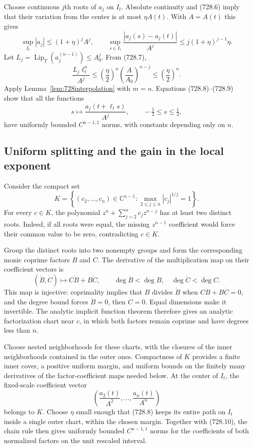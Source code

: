 \documentclass[11pt,a4paper]{article}
\theoremstyle{remark}
\begin{document}
Choose continuous $j$th roots of $a_j$ on $I_t$.  Absolute continuity and
(728.6) imply that their variation from the center is at most $\eta A(t)$.
With $A=A(t)$ this gives
\[
 \sup_{I_t}|a_j|\le(1+\eta)^jA^j,
 \qquad
 \sup_{s\in I_t}\frac{|a_j(s)-a_j(t)|}{A^j}
       \le j(1+\eta)^{j-1}\eta.
 \tag{728.8}
\]
Let $L_j=\operatorname{Lip}_T(a_j^{(n-1)})\le A_0^j$.  From (728.7),
\[
 \frac{L_j\ell_t^n}{A^j}
 \le \left(\frac\eta2\right)^n
           \left(\frac{A}{A_0}\right)^{n-j}
 \le \left(\frac\eta2\right)^n.
 \tag{728.9}
\]
Apply Lemma~\ref{lem:728interpolation} with $m=n$.  Equations
(728.8)--(728.9) show that all the functions
\[
 s\longmapsto\frac{a_j(t+\ell_ts)}{A^j},
 \qquad -\tfrac12\le s\le\tfrac12,
 \tag{728.10}
\]
have uniformly bounded $C^{n-1,1}$ norms, with constants depending only
on $n$.

\subsection{Uniform splitting and the gain in the local exponent}

Consider the compact set
\[
 K=\left\{(c_2,\ldots,c_n)\in\mathbb C^{n-1}:
                   \max_{2\le j\le n}|c_j|^{1/j}=1\right\}.
\]
For every $c\in K$, the polynomial
$z^n+\sum_{j=2}^nc_jz^{n-j}$ has at least two distinct roots.  Indeed, if
all roots were equal, the missing $z^{n-1}$ coefficient would force their
common value to be zero, contradicting $c\in K$.

Group the distinct roots into two nonempty groups and form the corresponding
monic coprime factors $B$ and $C$.  The derivative of the multiplication map
on their coefficient vectors is
\[
 (\dot B,\dot C)\longmapsto C\dot B+B\dot C,
 \qquad \deg\dot B<\deg B,\quad\deg\dot C<\deg C.
\]
This map is injective: coprimality implies that $B$ divides $\dot B$ when
$C\dot B+B\dot C=0$, and the degree bound forces $\dot B=0$, then
$\dot C=0$.  Equal dimensions make it invertible.  The analytic implicit
function theorem therefore gives an analytic factorization chart near
$c$, in which both factors remain coprime and have degrees less than $n$.

Choose nested neighborhoods for these charts, with the closures of the
inner neighborhoods contained in the outer ones.  Compactness of $K$
provides a finite inner cover, a positive uniform margin, and uniform bounds
on the finitely many derivatives of the factor-coefficient maps needed
below.  At the center of $I_t$, the fixed-scale coefficient vector
\[
 \left(\frac{a_2(t)}{A^2},\ldots,\frac{a_n(t)}{A^n}\right)
\]
belongs to $K$.  Choose $\eta$ small enough that (728.8) keeps its entire
path on $I_t$ inside a single outer chart, within the chosen margin.
Together with (728.10), the chain rule then gives uniformly bounded
$C^{n-1,1}$ norms for the coefficients of both normalized factors on the
unit rescaled interval.
\end{document}
